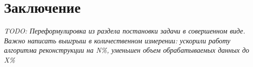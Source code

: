 \documentclass[14pt]{matmex-diploma}
\begin{document}
\section{Заключение} \label{sec:concluding}
\textit{TODO: Переформулировка из раздела постановки задачи в совершенном виде. Важно написать выигрыш в количественном измерении: ускорили работу алгоритма реконструкции на N\%, уменьшен объем обрабатываемых данных до X\%} \\
\\
\\






\setmonofont[Mapping=tex-text]{CMU Typewriter Text}


\end{document}
